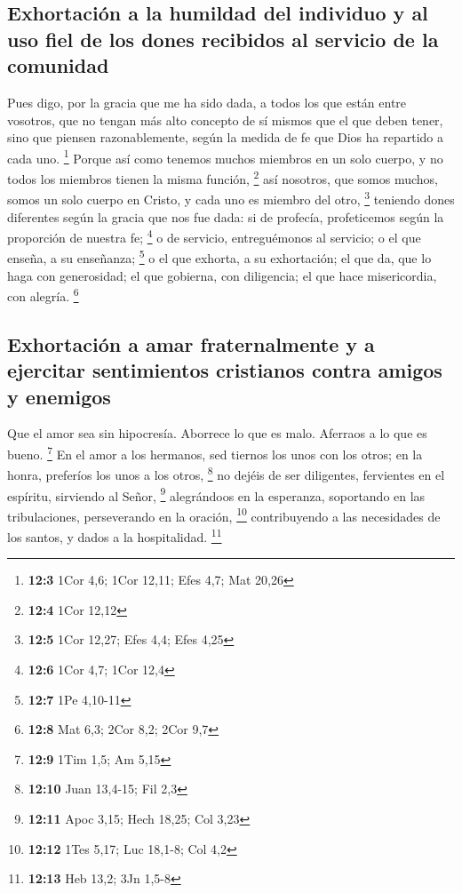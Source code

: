 \hypertarget{exhortaciuxf3n-a-la-humildad-del-individuo-y-al-uso-fiel-de-los-dones-recibidos-al-servicio-de-la-comunidad}{%
\subsection{Exhortación a la humildad del individuo y al uso fiel de los
dones recibidos al servicio de la
comunidad}\label{exhortaciuxf3n-a-la-humildad-del-individuo-y-al-uso-fiel-de-los-dones-recibidos-al-servicio-de-la-comunidad}}

 Pues digo, por la gracia que me ha sido dada, a todos los
que están entre vosotros, que no tengan más alto concepto de sí mismos
que el que deben tener, sino que piensen razonablemente, según la medida
de fe que Dios ha repartido a cada uno. \footnote{\textbf{12:3} 1Cor
  4,6; 1Cor 12,11; Efes 4,7; Mat 20,26}  Porque así como
tenemos muchos miembros en un solo cuerpo, y no todos los miembros
tienen la misma función, \footnote{\textbf{12:4} 1Cor 12,12}
 así nosotros, que somos muchos, somos un solo cuerpo en
Cristo, y cada uno es miembro del otro, \footnote{\textbf{12:5} 1Cor
  12,27; Efes 4,4; Efes 4,25}  teniendo dones diferentes
según la gracia que nos fue dada: si de profecía, profeticemos según la
proporción de nuestra fe; \footnote{\textbf{12:6} 1Cor 4,7; 1Cor 12,4}
 o de servicio, entreguémonos al servicio; o el que
enseña, a su enseñanza; \footnote{\textbf{12:7} 1Pe 4,10-11}
 o el que exhorta, a su exhortación; el que da, que lo
haga con generosidad; el que gobierna, con diligencia; el que hace
misericordia, con alegría. \footnote{\textbf{12:8} Mat 6,3; 2Cor 8,2;
  2Cor 9,7}

\hypertarget{exhortaciuxf3n-a-amar-fraternalmente-y-a-ejercitar-sentimientos-cristianos-contra-amigos-y-enemigos}{%
\subsection{Exhortación a amar fraternalmente y a ejercitar sentimientos
cristianos contra amigos y
enemigos}\label{exhortaciuxf3n-a-amar-fraternalmente-y-a-ejercitar-sentimientos-cristianos-contra-amigos-y-enemigos}}

 Que el amor sea sin hipocresía. Aborrece lo que es malo.
Aferraos a lo que es bueno. \footnote{\textbf{12:9} 1Tim 1,5; Am 5,15}
 En el amor a los hermanos, sed tiernos los unos con los
otros; en la honra, preferíos los unos a los otros, \footnote{\textbf{12:10}
  Juan 13,4-15; Fil 2,3}  no dejéis de ser diligentes,
fervientes en el espíritu, sirviendo al Señor, \footnote{\textbf{12:11}
  Apoc 3,15; Hech 18,25; Col 3,23}  alegrándoos en la
esperanza, soportando en las tribulaciones, perseverando en la oración,
\footnote{\textbf{12:12} 1Tes 5,17; Luc 18,1-8; Col 4,2} 
contribuyendo a las necesidades de los santos, y dados a la
hospitalidad. \footnote{\textbf{12:13} Heb 13,2; 3Jn 1,5-8}

